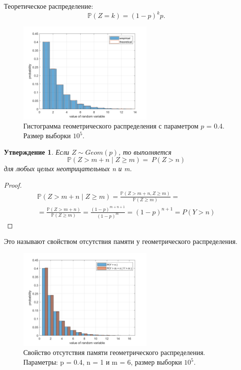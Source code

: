 \documentclass[oneside, final, 12pt]{article}
\def\P{{\mathbb{P} }}
\newtheorem{statement}{Утверждение}
\begin{document}
    Теоретическое распределение: $$\P(Z=k) = (1-p)^{k}p.$$
    \begin{figure}[h!]
		\centering
		\includegraphics[width=0.6\textwidth]{../code/Task_1/pict/geom_vis_ex.png}
		\caption{Гистограмма геометрического распределения с параметром $p$ = 0.4.
		\newline \centering  Размер выборки $10^5$.}
    \end{figure}

    \begin{statement}
    Если $Z \sim Geom(p)$, то выполняется 
            $$\P(Z > m + n \mid Z \geqslant m) =\ P(Z > n)$$ для любых целых неотрицательных n и m. 
    \end{statement}

    \begin{proof}
        \begin{multline}
          \P(Z > m + n \mid Z \geqslant m) = \frac{\P(Z > m + n, Z \geqslant m)}{\P(Z\geqslant m)} =\\
            = \frac{\P(Z >  m + n)}{\P(Z \geqslant m)}  =
            \frac{(1-p)^{m+n+1}}{(1-p)^m} = 
                (1-p)^{n+1} = P(Y > n)
        \end{multline}
    \end{proof}
    Это называют свойством отсутствия памяти у геометрического распределения.
    \begin{figure}[h!]
		\centering
		\includegraphics[width=0.6\textwidth]{../code/Task_1/pict/mmls_prop_ex.png}
		\caption{Свойство отсутствия памяти геометрического распределения. 
		\newline \centering  Параметры: p = 0.4, n = 1 и m = 6, размер выборки $10^5$.}
    \end{figure}
    
\end{document}
